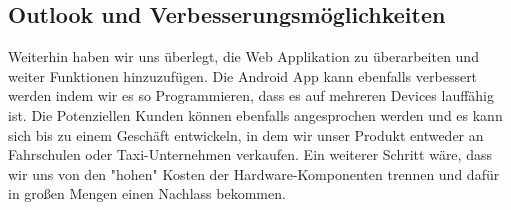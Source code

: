 \subsection{Outlook und Verbesserungsmöglichkeiten}

Weiterhin haben wir uns überlegt, die Web Applikation zu überarbeiten und weiter Funktionen hinzuzufügen.            
Die Android App kann ebenfalls verbessert werden indem wir es so Programmieren, dass es auf mehreren Devices lauffähig ist. Die Potenziellen Kunden können ebenfalls angesprochen werden und es kann sich bis zu einem Geschäft entwickeln, in dem wir unser Produkt entweder an Fahrschulen oder Taxi-Unternehmen verkaufen.                  
Ein weiterer Schritt wäre, dass wir uns von den "hohen" Kosten der Hardware-Komponenten trennen und dafür in großen Mengen einen Nachlass bekommen. 



\clearpage %